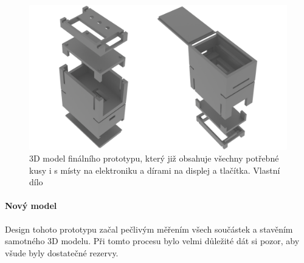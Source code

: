 \begin{figure}[ht]
  \includegraphics[scale=0.13, center]{Kapitoly/Prakticka/Obrazky/Finální.png}
  \caption [3D model finálního prototypu]{3D model finálního prototypu, který již obsahuje  všechny potřebné kusy i s místy na elektroniku a dírami na displej a tlačítka. Vlastní dílo}
  \label{fig:3D_model_finálního_prototypu}
\end{figure}
\paragraph{Nový model}
Design tohoto prototypu začal pečlivým měřením všech součástek a stavěním samotného 3D modelu. Při tomto procesu bylo velmi důležité dát si pozor, aby všude byly dostatečné rezervy.
